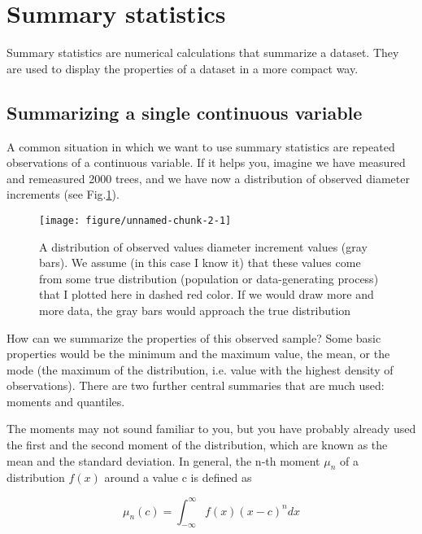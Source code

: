 \documentclass[a4paper,twoside]{tufte-book}\usepackage[]{graphicx}\usepackage[]{color}
\makeatletter
\def\maxwidth{ %
  \ifdim\Gin@nat@width>\linewidth
    \linewidth
  \else
    \Gin@nat@width
  \fi
}
\makeatother
\begin{document}
\section{Summary statistics}

Summary statistics are numerical calculations that summarize a dataset. They are used to display the properties of a dataset in a more compact way. 

\subsection{Summarizing a single continuous variable}

A common situation in which we want to use summary statistics are repeated observations of a continuous variable. If it helps you, imagine we have measured and remeasured 2000 trees, and we have now a distribution of observed diameter increments (see Fig.\ref{fig: data distribution}).

\begin{figure}[htbp]
\begin{center}
\begin{Schunk}

\texttt{[image: figure/unnamed-chunk-2-1]} \end{Schunk}
\caption{A distribution of observed values diameter increment values (gray bars). We assume (in this case I know it) that these values come from some true distribution (population or data-generating process) that I plotted here in dashed red color. If we would draw more and more data, the gray bars would approach the true distribution}
\label{fig: data distribution}
\end{center}
\end{figure}

How can we summarize the properties of this observed sample? Some basic properties would be the minimum and the maximum value, the mean, or the mode (the maximum of the distribution, i.e. value with the highest density of observations). There are two further central summaries that are much used: moments and quantiles.

The moments may not sound familiar to you, but you have probably already used the first and the second moment of the distribution, which are known as the mean and the standard deviation. In general, the n-th moment $\mu_n$ of a distribution $f(x)$ around a value c is defined as 

\begin{equation}
\mu_n(c) = \int_{-\infty}^{\infty} f(x) (x - c)^n dx
\end{equation}
\end{document}
